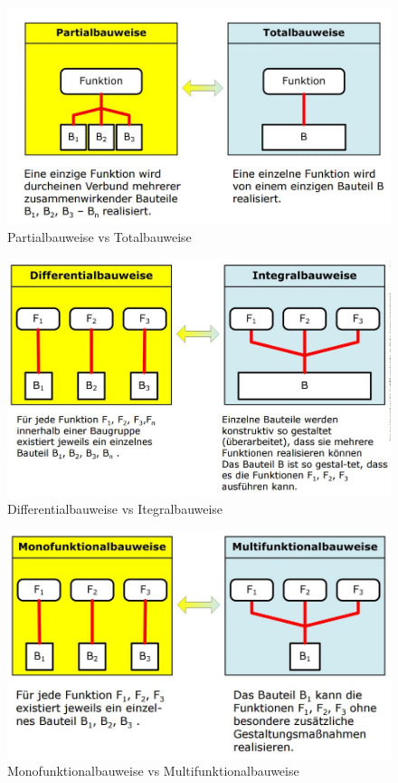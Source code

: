 \begin{figure}[h]
	\centering
	\includegraphics[scale=0.5]{Bauweise1.jpg}
	\caption{Partialbauweise vs Totalbauweise}
	\end{figure}


\begin{figure}[h]
	\centering
	\includegraphics[scale=0.5]{Bauweise2.jpg}
	\caption{Differentialbauweise vs Itegralbauweise}
\end{figure}


\begin{figure}[h]
	\centering
	\includegraphics[scale=0.5]{Bauweise3.jpg}
	\caption{Monofunktionalbauweise vs Multifunktionalbauweise}
\end{figure}


